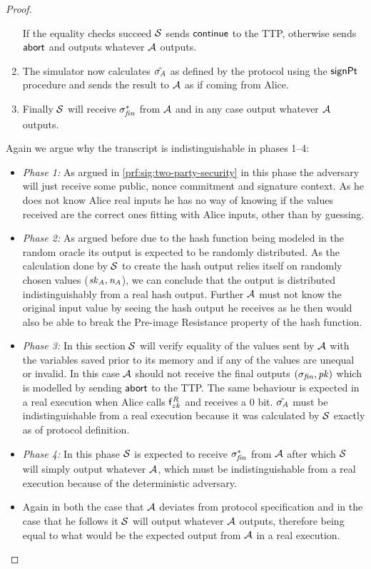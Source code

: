\begin{proof}
\begin{enumerate}
        If the equality checks succeed $\mathcal{S}$ sends $\mathsf{continue}$ to the TTP, otherwise sends $\mathsf{abort}$ and outputs whatever $\mathcal{A}$ outputs.
        \item The simulator now calculates $\tilde{\sigma_{\mathit{A}}}$ as defined by the protocol using the $\mathsf{signPt}$ procedure and sends the result to $\mathcal{A}$ as if coming from Alice.
        \item Finally $\mathcal{S}$ will receive $\sigma_{\mathit{fin}}^*$ from $\mathcal{A}$ and in any case output whatever $\mathcal{A}$ outputs.
    \end{enumerate}
    
    Again we argue why the transcript is indistinguishable in phases 1--4:
    \begin{itemize}
        \item \textit{Phase 1:} As argued in \cref{prf:sig:two-party-security} in this phase the adversary will just receive some public, nonce commitment and signature context.
        As he does not know Alice real inputs he has no way of knowing if the values received are the correct ones fitting with Alice inputs, other than by guessing.
        \item \textit{Phase 2:} As argued before due to the hash function being modeled in the random oracle its output is expected to be randomly distributed.
        As the calculation done by $\mathcal{S}$ to create the hash output relies itself on randomly chosen values ($\mathit{sk}_{\mathit{A}}, \mathit{\mathit{n}_{\mathit{A}}}$), we can conclude that the output is distributed indistinguishably from a real hash output.
        Further $\mathcal{A}$ must not know the original input value by seeing the hash output he receives as he then would also be able to break the Pre-image Resistance property of the hash function.
        \item \textit{Phase 3:} In this section $\mathcal{S}$ will verify equality of the values sent by $\mathcal{A}$ with the variables saved prior to its memory and if any of the values are unequal or invalid.
        In this case $\mathcal{A}$ should not receive the final outputs $(\sigma_{\mathit{fin}}, \mathit{pk})$ which is modelled by sending $\mathsf{abort}$ to the TTP.
        The same behaviour is expected in a real execution when Alice calls $\mathsf{f}^{\mathit{R}}_{zk}$ and receives a 0 bit.
        $\tilde{\sigma_{\mathit{A}}}$ must be indistinguishable from a real execution because it was calculated by $\mathcal{S}$ exactly as of protocol definition.
        \item \textit{Phase 4:} In this phase $\mathcal{S}$ is expected to receive $\sigma_{\mathit{fin}}^*$ from $\mathcal{A}$ after which $\mathcal{S}$ will simply output whatever $\mathcal{A}$, which must be indistinguishable from a real execution because of the deterministic adversary.
        \item Again in both the case that $\mathcal{A}$ deviates from protocol specification and in the case that he follows it $\mathcal{S}$ will output whatever $\mathcal{A}$ outputs, therefore being equal to what would be the expected output from $\mathcal{A}$ in a real execution.
    \end{itemize}


\end{proof}
